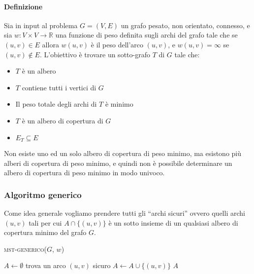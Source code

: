         \paragraph{Definizione} 
            Sia in input al problema $G=(V,E)$ un grafo pesato, non orientato, connesso, e sia $w: V\times V \rightarrow \mathbb{R}$ una funzione di peso definita sugli archi del grafo tale che se $(u,v) \in E$ allora $w(u,v)$ è il peso dell'arco $(u,v)$, e $w(u,v) = \infty$ se $(u,v) \notin E$. L'obiettivo è trovare un sotto-grafo $T$ di $G$ tale che:
            \begin{itemize}
                \item $T$ è un albero
                \item $T$ contiene tutti i vertici di $G$
                \item Il peso totale degli archi di $T$ è minimo
                \item $T$ è un albero di copertura di $G$
                \item $E_T \subseteq E$
            \end{itemize}
            Non esiste uno ed un solo albero di copertura di peso minimo, ma esistono più alberi di copertura di peso minimo, e quindi non è possibile determinare un albero di copertura di peso minimo in modo univoco.
        \subsubsection{Algoritmo generico}
            Come idea generale vogliamo prendere tutti gli ``archi sicuri'' ovvero quelli archi $(u,v)$ tali per cui $A\cap \{(u,v)\}$ è un sotto insieme di un qualsiasi albero di copertura minimo del grafo $G$. 
            \begin{algorithm}[H]
                \caption{\Set \textsc{mst-generico}(\Graph $G$, \Int[] $w$)}
                \begin{algorithmic}
                    \State \Set $A \gets \emptyset$
                        \State trova un arco $(u,v)$ sicuro
                        \State $A \gets A \cup \{(u,v)\}$
                    \EndWhile
                    \State \Return $A$
                \end{algorithmic}
            \end{algorithm}
            